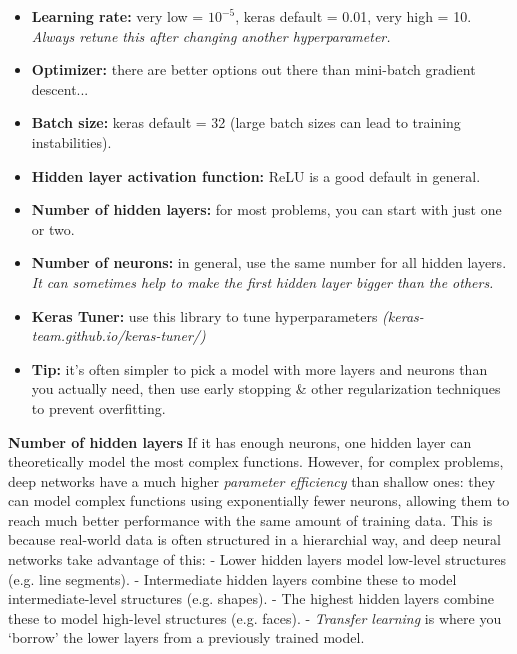 \vspace{-5.0mm}
\begin{itemize}
\item
\textbf{Learning rate:} very low = $10^{-5}$, keras default = 0.01, very high = 10.\newline
\textit{Always retune this after changing another hyperparameter.}
\item
\textbf{Optimizer:} there are better options out there than mini-batch gradient descent...
\item
\textbf{Batch size:} keras default = 32 (large batch sizes can lead to training instabilities).
\item
\textbf{Hidden layer activation function:} ReLU is a good default in general.
\item
\textbf{Number of hidden layers:} for most problems, you can start with just one or two.
\item
\textbf{Number of neurons:} in general, use the same number for all hidden layers.\newline
\textit{It can sometimes help to make the first hidden layer bigger than the others.}
\item
\textbf{Keras Tuner:} use this library to tune hyperparameters \textit{(keras-team.github.io/keras-tuner/)}
\item
\textbf{Tip:} it's often simpler to pick a model with more layers and neurons than you actually need,
then use early stopping \& other regularization techniques to prevent overfitting.
\end{itemize}
% 
\textbf{Number of hidden layers}\newline
If it has enough neurons, one hidden layer can theoretically model the most complex functions.
% 
However, for complex problems,
deep networks have a much higher \textit{parameter efficiency} than shallow ones:
they can model complex functions using exponentially fewer neurons,
allowing them to reach much better performance with the same amount of training data.
% 
This is because real-world data is often structured in a hierarchial way,
and deep neural networks take advantage of this:\newline
- Lower hidden layers model low-level structures (e.g. line segments).\newline
- Intermediate hidden layers combine these to model intermediate-level structures (e.g. shapes).\newline
- The highest hidden layers combine these to model high-level structures (e.g. faces).\newline
- \textit{Transfer learning} is where you `borrow' the lower layers from a previously trained model.


